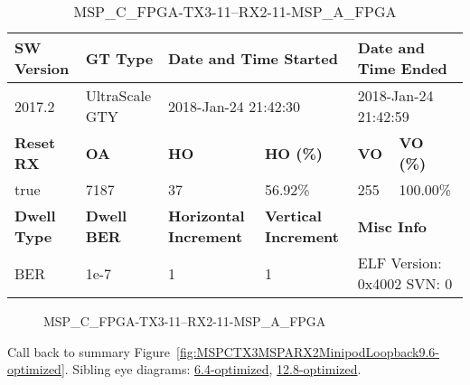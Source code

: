 \begin{table}[h]
\centering
\caption{MSP\_C\_FPGA-TX3-11--RX2-11-MSP\_A\_FPGA}
\label{tab:MSPCFPGATX311RX211MSPAFPGA9.6-optimized}
\begin{tabular}{@{}|l|l|l|l|l|l|@{}}
\toprule
\textbf{SW Version}                & \textbf{GT Type}   & \multicolumn{2}{l|}{\textbf{Date and Time Started}}            & \multicolumn{2}{l|}{\textbf{Date and Time Ended}}        \\ \midrule
2017.2                       & UltraScale GTY          & \multicolumn{2}{l|}{2018-Jan-24 21:42:30}                   & \multicolumn{2}{l|}{2018-Jan-24 21:42:59}               \\ \midrule
\textbf{Reset RX}                  & \textbf{OA} & \textbf{HO}   & \textbf{HO (\%)} & \textbf{VO} & \textbf{VO (\%)} \\ \midrule
true & 7187        & 37          & 56.92\%        & 255        & 100.00\%       \\ \midrule
\textbf{Dwell Type}                & \textbf{Dwell BER} & \textbf{Horizontal Increment} & \textbf{Vertical Increment}    & \multicolumn{2}{l|}{\textbf{Misc Info}}                  \\ \midrule
BER                            & 1e-7        & 1        & 1           & \multicolumn{2}{l|}{ELF Version: 0x4002 SVN: 0}                         \\ \bottomrule
\end{tabular}
\end{table}

\begin{figure}[h]
\caption{MSP\_C\_FPGA-TX3-11--RX2-11-MSP\_A\_FPGA} \label{fig:MSPCFPGATX311RX211MSPAFPGA9.6-optimized}
\end{figure}

Call back to summary Figure~\ref{fig:MSPCTX3MSPARX2MinipodLoopback9.6-optimized}.
Sibling eye diagrams: \hyperref[sec:MSPCFPGATX311RX211MSPAFPGA6.4-optimized]{6.4-optimized}, \hyperref[sec:MSPCFPGATX311RX211MSPAFPGA12.8-optimized]{12.8-optimized}.

\clearpage
\newpage

